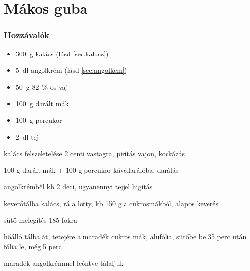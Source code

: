 \newpage
\section{Mákos guba} \label{sec:makos_guba}

\subsubsection*{Hozzávalók}
\begin{itemize}
    \item \qty{300}{\g} kalács (lásd \ref{sec:kalacs})
    \item \qty{5}{\deci\l} angolkrém (lásd \ref{sec:angolkem})
    \item \qty{50}{\g} \qty{82}{\percent}-os vaj
    \item \qty{100}{\g} darált mák
    \item \qty{100}{\g} porcukor
    \item \qty{2}{\deci\l} tej
\end{itemize}

kalács felszeletelése 2 centi vastagra, pirítás vajon, kockázás

100 g darált mák + 100 g porcukor kávédarálóba, darálás

angolkrémből kb 2 deci, ugyanennyi tejjel higítás

keverőtálba kalács, rá a lötty, kb 150 g a cukrosmákból, alapos keverés

sütő melegítés 185 fokra

hőálló tálba át, tetejére a maradék cukros mák, alufólia, sütőbe be 35 perc után fólia le, még 5 perc

maradék angolkrémmel leöntve tálaljuk

